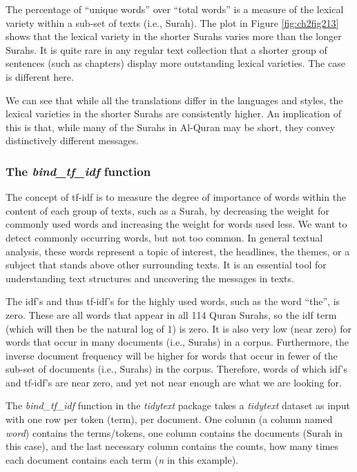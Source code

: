 \documentclass[
]{article}
\begin{document}
The percentage of ``unique words'' over ``total words'' is a measure of the lexical variety within a sub-set of texts (i.e., Surah). The plot in Figure \ref{fig:ch2fig213} shows that the lexical variety in the shorter Surahs varies more than the longer Surahs. It is quite rare in any regular text collection that a shorter group of sentences (such as chapters) display more outstanding lexical varieties. The case is different here.

We can see that while all the translations differ in the languages and styles, the lexical varieties in the shorter Surahs are consistently higher. An implication of this is that, while many of the Surahs in Al-Quran may be short, they convey distinctively different messages.

\hypertarget{the-bind_tf_idf-function}{%
\subsubsection{\texorpdfstring{The \emph{bind\_tf\_idf} function}{The bind\_tf\_idf function}}\label{the-bind_tf_idf-function}}

The concept of tf-idf is to measure the degree of importance of words within the content of each group of texts, such as a Surah, by decreasing the weight for commonly used words and increasing the weight for words used less. We want to detect commonly occurring words, but not too common. In general textual analysis, these words represent a topic of interest, the headlines, the themes, or a subject that stands above other surrounding texts. It is an essential tool for understanding text structures and uncovering the messages in texts.

The idf's and thus tf-idf's for the highly used words, such as the word ``the'', is zero. These are all words that appear in all 114 Quran Surahs, so the idf term (which will then be the natural log of 1) is zero. It is also very low (near zero) for words that occur in many documents (i.e., Surahs) in a corpus. Furthermore, the inverse document frequency will be higher for words that occur in fewer of the sub-set of documents (i.e., Surahs) in the corpus. Therefore, words of which idf's and tf-idf's are near zero, and yet not near enough are what we are looking for.

The \emph{bind\_tf\_idf} function in the \emph{tidytext} package takes a \emph{tidytext} dataset as input with one row per token (term), per document. One column (a column named \emph{word}) contains the terms/tokens, one column contains the documents (Surah in this case), and the last necessary column contains the counts, how many times each document contains each term (\emph{n} in this example).
\end{document}
